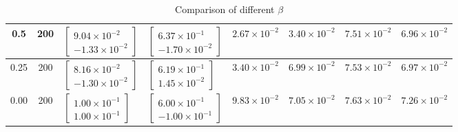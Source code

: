 \documentclass{article}
\begin{document}
\begin{table}[h!]
\begin{center}
\begin{tabular}{|c|c|m{3.0cm}|m{3.0cm}|m{1.7cm}|m{1.7cm}|c|c|}
			\hline
			0.5 & 200 & $\begin{bmatrix}9.04\times 10^{-2} \\ -1.33\times 10^{-2}\end{bmatrix}$ & $\begin{bmatrix}6.37\times 10^{-1} \\ -1.70\times 10^{-2}\end{bmatrix}$ & $2.67\times 10^{-2}$ & $3.40\times 10^{-2}$ & $7.51\times 10^{-2}$ & $6.96\times 10^{-2}$\\
			\hline
			0.25 & 200 & $\begin{bmatrix}8.16\times 10^{-2} \\ -1.30\times 10^{-2}\end{bmatrix}$ & $\begin{bmatrix}6.19\times 10^{-1} \\ 1.45\times 10^{-2}\end{bmatrix}$ & $3.40\times 10^{-2}$ & $6.99\times 10^{-2}$ & $7.53\times 10^{-2}$ & $6.97\times 10^{-2}$\\ 
			\hline
			0.00 & 200 & $\begin{bmatrix}1.00\times 10^{-1} \\ 1.00\times 10^{-1}\end{bmatrix}$ & $\begin{bmatrix}6.00\times 10^{-1} \\ -1.00\times 10^{-1}\end{bmatrix}$ & $9.83\times 10^{-2}$ & $7.05\times 10^{-2}$ & $7.63\times 10^{-2}$ & $7.26\times 10^{-2}$\\ 
			\hline
		\end{tabular}
	\end{center}
	\caption{Comparison of different $\beta$}
	\label{table:2}
\end{table}
\end{document}
